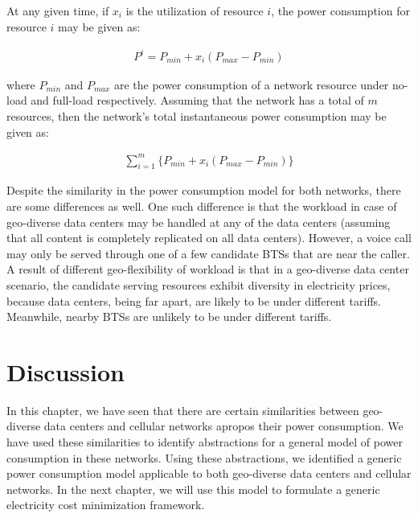 At any given time, if $x_i$ is the utilization of resource $i$, the power consumption for resource $i$ may be given as:

\begin{align}
P^i = P_{min} + x_i (P_{max} - P_{min})
\end{align}

where $P_{min}$ and $P_{max}$ are the power consumption of a network resource under no-load and full-load respectively. Assuming that the network has a total of $m$ resources, then the network's total instantaneous power consumption may be given as:

\begin{align}
\sum_{i=1}^m \{ P_{min} + x_i (P_{max} - P_{min}) \}
\label{eq:abdcpaper}
\end{align}

Despite the similarity in the power consumption model for both networks, there are some differences as well. One such difference is that the workload in case of geo-diverse data centers may be handled at any of the data centers (assuming that all content is completely replicated on all data centers). However, a voice call may only be served through one of a few candidate BTSs that are near the caller. A result of different geo-flexibility of workload is that in a geo-diverse data center scenario, the candidate serving resources exhibit diversity in electricity prices, because data centers, being far apart, are likely to be under different tariffs. Meanwhile, nearby BTSs are unlikely to be under different tariffs. 

\section{Discussion}
In this chapter, we have seen that there are certain similarities between geo-diverse data centers and cellular networks apropos their power consumption. We have used these similarities to identify abstractions for a general model of power consumption in these networks. Using these abstractions, we identified a generic power consumption model applicable to both geo-diverse data centers and cellular networks. In the next chapter, we will use this model to formulate a generic electricity cost minimization framework.